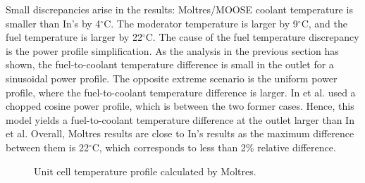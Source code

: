Small discrepancies arise in the results: Moltres/MOOSE coolant temperature is smaller than In's by 4$^{\circ}$C.
The moderator temperature is larger by 9$^{\circ}$C, and the fuel temperature is larger by 22$^{\circ}$C.
The cause of the fuel temperature discrepancy is the power profile simplification.
As the analysis in the previous section has shown, the fuel-to-coolant temperature difference is small in the outlet for a sinusoidal power profile. 
The opposite extreme scenario is the uniform power profile, where the fuel-to-coolant temperature difference is larger.
In et al. used a chopped cosine power profile, which is between the two former cases.
Hence, this model yields a fuel-to-coolant temperature difference at the outlet larger than In et al.
Overall, Moltres results are close to In's results as the maximum difference between them is 22$^{\circ}$C, which corresponds to less than 2\% relative difference.

\begin{figure}[htbp!]
  \centering
  \hfill
  \caption{Unit cell temperature profile calculated by Moltres.}
  \label{fig:th-val-unit-temps}
\end{figure}


